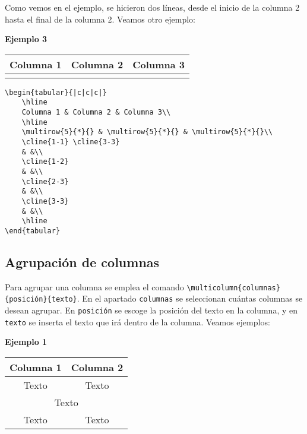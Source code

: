 Como vemos en el ejemplo, se hicieron dos líneas, desde el inicio de la columna 2 hasta el final de la columna 2. Veamos otro ejemplo:

\textbf{Ejemplo 3}

\begin{center}
	\begin{tabular}{|c|c|c|}
		\hline
		Columna 1 & Columna 2 & Columna 3\\
		\hline
		\multirow{5}{*}{} & \multirow{5}{*}{} & \multirow{5}{*}{}\\
		\cline{1-1} \cline{3-3}
		& &\\ 
		\cline{1-2}
		& &\\
		\cline{2-3}
		& &\\
		\cline{3-3}
		& &\\
		\hline
	\end{tabular}
\end{center}

\begin{myquote}
	\begin{lstlisting}
\begin{tabular}{|c|c|c|}
	\hline
	Columna 1 & Columna 2 & Columna 3\\
	\hline
	\multirow{5}{*}{} & \multirow{5}{*}{} & \multirow{5}{*}{}\\        
	\cline{1-1} \cline{3-3}
	& &\\ 
	\cline{1-2}
	& &\\
	\cline{2-3}
	& &\\
	\cline{3-3}
	& &\\
	\hline
\end{tabular}		
	\end{lstlisting}			
\end{myquote}


\subsection{Agrupación de columnas}

Para agrupar una columna se emplea el comando \verb|\multicolumn{columnas}{posición}{texto}|. En el apartado \verb|columnas| se seleccionan cuántas columnas se desean agrupar. En \verb|posición| se escoge la posición del texto en la columna, y en \verb|texto| se inserta el texto que irá dentro de la columna. Veamos ejemplos:

\textbf{Ejemplo 1}

\begin{center}
	\begin{tabular}{|c|c|}
		\hline
		Columna 1 & Columna 2\\
		\hline
		Texto & Texto\\
		\hline
		\multicolumn{2}{|c|}{Texto}\\
		\hline
		Texto & Texto\\
		\hline
	\end{tabular}
\end{center}


